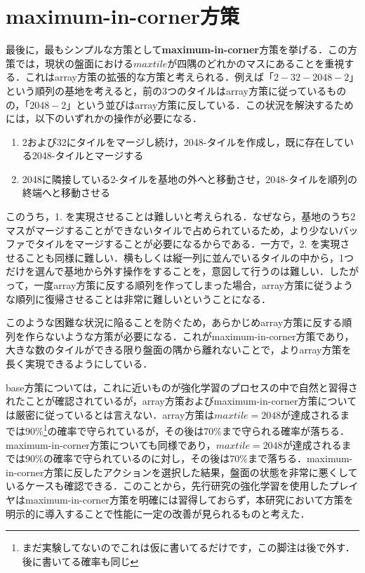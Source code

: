 \documentclass{suribt}
\begin{document}
\section{maximum-in-corner方策}
最後に，最もシンプルな方策として\textbf{maximum-in-corner}方策を挙げる．この方策では，現状の盤面における$max tile$が四隅のどれかのマスにあることを重視する．これはarray方策の拡張的な方策と考えられる．例えば「$2-32-2048-2$」という順列の基地を考えると，前の3つのタイルはarray方策に従っているものの，「$2048-2$」という並びはarray方策に反している．この状況を解決するためには，以下のいずれかの操作が必要になる．

\begin{enumerate}
\item 2および32にタイルをマージし続け，2048-タイルを作成し，既に存在している2048-タイルとマージする
\item 2048に隣接している2-タイルを基地の外へと移動させ，2048-タイルを順列の終端へと移動させる
\end{enumerate}

このうち，1. を実現させることは難しいと考えられる．なぜなら，基地のうち2マスがマージすることができないタイルで占められているため，より少ないバッファでタイルをマージすることが必要になるからである．一方で，2. を実現させることも同様に難しい．横もしくは縦一列に並んでいるタイルの中から，1つだけを選んで基地から外す操作をすることを，意図して行うのは難しい．したがって，一度array方策に反する順列を作ってしまった場合，array方策に従うような順列に復帰させることは非常に難しいということになる．

このような困難な状況に陥ることを防ぐため，あらかじめarray方策に反する順列を作らないような方策が必要になる．これがmaximum-in-corner方策であり，大きな数のタイルができる限り盤面の隅から離れないことで，よりarray方策を長く実現できるようにしている．

base方策については，これに近いものが強化学習のプロセスの中で自然と習得されたことが確認されているが，array方策およびmaximum-in-corner方策については厳密に従っているとは言えない．array方策は$maxtile=2048$が達成されるまでは$90\%$\footnote{まだ実験してないのでこれは仮に書いてるだけです，この脚注は後で外す．後に書いてる確率も同じ}の確率で守られているが，その後は$70\%$まで守られる確率が落ちる．maximum-in-corner方策についても同様であり，$maxtile=2048$が達成されるまでは$90\%$の確率で守られているのに対し，その後は$70\%$まで落ちる．maximum-in-corner方策に反したアクションを選択した結果，盤面の状態を非常に悪くしているケースも確認できる．このことから，先行研究の強化学習を使用したプレイヤはmaximum-in-corner方策を明確には習得しておらず，本研究において方策を明示的に導入することで性能に一定の改善が見られるものと考えた．
\end{document}
